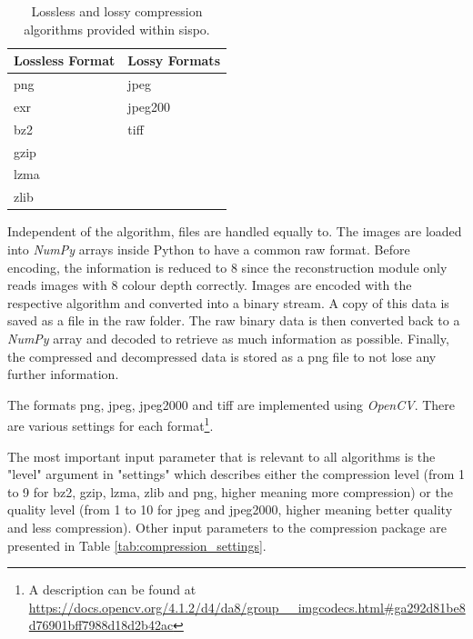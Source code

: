 \begin{table}[htpb]
    \centering
    \caption{Lossless and lossy compression algorithms provided within \gls{sispo}.}
    \label{tab:compression_format}
    \begin{tabular}{l|l}
        \textbf{Lossless Format} & \textbf{Lossy Formats} \\ \hline
        png               & jpeg           \\
        exr               & jpeg200        \\
        bz2               & tiff           \\
        gzip              &                \\
        lzma              &                \\
        zlib              &               
    \end{tabular}
\end{table}

Independent of the algorithm, files are handled equally to. The images are loaded into \textit{NumPy} arrays inside Python to have a common raw format. Before encoding, the information is reduced to \SI{8}{\bit} since the reconstruction module only reads images with \SI{8}{\bit} colour depth correctly. Images are encoded with the respective algorithm and converted into a binary stream. A copy of this data is saved as a file in the raw folder. The raw binary data is then converted back to a \textit{NumPy} array and decoded to retrieve as much information as possible. Finally, the compressed and decompressed data is stored as a png file to not lose any further information.

The formats png, jpeg, jpeg2000 and tiff are implemented using \textit{OpenCV}. There are various settings for each format\footnote{A description can be found at \url{https://docs.opencv.org/4.1.2/d4/da8/group__imgcodecs.html\#ga292d81be8d76901bff7988d18d2b42ac}}.

The most important input parameter that is relevant to all algorithms is the "level" argument in "settings" which describes either the compression level (from 1 to 9 for bz2, gzip, lzma, zlib and png, higher meaning more compression) or the quality level (from 1 to 10 for jpeg and jpeg2000, higher meaning better quality and less compression). Other input parameters to the compression package are presented in Table \ref{tab:compression_settings}.


